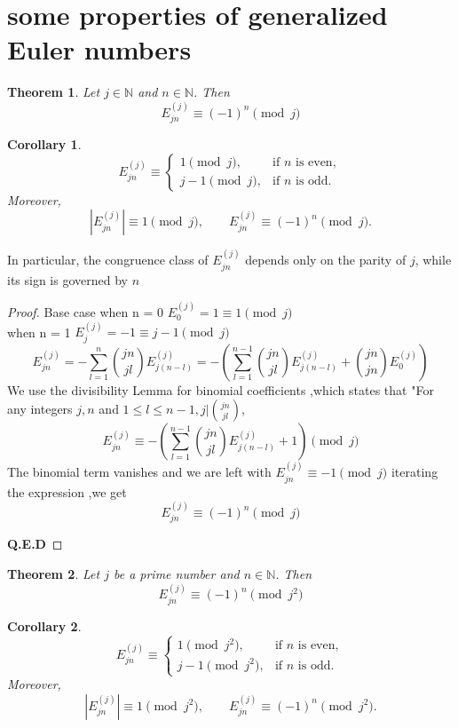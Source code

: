 \documentclass{article}
\newtheorem{Theorem}{Theorem}
\newtheorem{corollary}{Corollary}
\begin{document}
\section{some properties of generalized Euler numbers}
\begin{Theorem}
Let $j \in \mathbb{N}$ and $n \in \mathbb{N}$. Then \[E^{(j)}_{jn} \equiv (-1)^n \pmod{j}\]
\end{Theorem} 
\begin{corollary}
\[E^{(j)}_{jn} \equiv
\begin{cases}
1 \pmod{j}, & \text{if } n \text{ is even},\\
j-1 \pmod{j}, & \text{if } n \text{ is odd}.
\end{cases}\]
Moreover,
\[|E^{(j)}_{jn}| \equiv 1 \pmod{j},
\qquad E^{(j)}_{jn} \equiv (-1)^n \pmod{j}.\]
\end{corollary}
In particular, the congruence class of $E^{(j)}_{jn}$ depends only on the parity of 
$j$, while its sign is governed by $n$
\begin{proof}
Base case when n = 0 $E^{(j)}_{0} = 1 \equiv 1 \pmod{j}$ \\
when n = 1 $E^{(j)}_{j} = -1 \equiv j-1 \pmod{j}$\\
\[E^{(j)}_{jn} = -\sum_{l=1}^{n} \binom{jn}{jl}E^{(j)}_{j(n-l)} =  -(\sum_{l=1}^{n-1} \binom{jn}{jl}E^{(j)}_{j(n-l)} + \binom{jn}{jn}E^{(j)}_{0})\]
We use the divisibility Lemma for binomial coefficients ,which states that "For any integers 
$j,n$ and $1\leq l\leq n-1,j | \binom{jn}{jl}$, 
\[E^{(j)}_{jn} \equiv -(\sum_{l=1}^{n-1} \binom{jn}{jl}E^{(j)}_{j(n-l)} +1) \pmod{j}\]
The binomial term vanishes and we are left with $E^{(j)}_{jn} \equiv -1 \pmod{j}$
iterating the expression ,we get
\[E^{(j)}_{jn} \equiv (-1)^n \pmod{j} \]

\textbf{Q.E.D}
\end{proof}
\begin{Theorem}
Let $j$ be a prime number and $n \in \mathbb{N}$. Then \[E^{(j)}_{jn} \equiv (-1)^n \pmod{j^2}\]
\end{Theorem} 
\begin{corollary}
\[E^{(j)}_{jn} \equiv
\begin{cases}
1 \pmod{j^2}, & \text{if } n \text{ is even},\\
j-1 \pmod{j^2}, & \text{if } n \text{ is odd}.
\end{cases}\]
Moreover,
\[|E^{(j)}_{jn}| \equiv 1 \pmod{j^2},
\qquad E^{(j)}_{jn} \equiv (-1)^n \pmod{j^2}.\]
\end{corollary}
\end{document}
